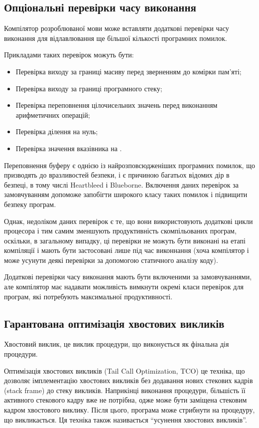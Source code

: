 \documentclass[main.tex]{subfiles}
\begin{document}
\subsection{Опціональні перевірки часу виконання}
Компілятор розроблюваної мови може вставляти додаткові перевірки часу виконання для відлавлювання ще більшої кількості програмних помилок.

Прикладами таких перевірок можуть бути:
\begin{itemize}[nosep]
\item Перевірка виходу за границі масиву перед зверненням до комірки пам'яті;
\item Перевірка виходу за границі програмного стеку;
\item Перевірка переповнення цілочисельних значень перед виконанням арифметичних операцій;
\item Перевірка ділення на нуль;
\item Перевірка значення вказівника на .
\end{itemize}

Переповнення буферу є однією із найрозповсюдженіших програмних помилок, що призводять до вразливостей безпеки, і є причиною багатьох відомих дір в безпеці, в тому числі Heartbleed\cite{heartbleed} і Blueborne\cite{blueborne}.
Включення даних перевірок за замовчуванням допоможе запобігти широкого класу таких помилок і підвищити безпеку програм.

Однак, недоліком даних перевірок є те, що вони використовують додаткові цикли процесора і тим самим зменшують продуктивність скомпільованих програм, оскільки, в загальному випадку, ці перевірки не можуть бути виконані на етапі компіляції і мають бути застосовані лише під час виконнання (хоча компілятор і може усунути деякі перевірки за допомогою статичного аналізу коду).

Додаткові перевірки часу виконання мають бути включеними за замовчуваннями, але компілятор має надавати можливість вимкнути окремі класи перевірок для програм, які потребують максимальної продуктивності.

\subsection{Гарантована оптимізація хвостових викликів}
Хвостовий виклик, це виклик процедури, що виконується як фінальна дія процедури.

Оптимізація хвостових викликів (Tail Call Optimization, TCO) це техніка, що дозволяє імплементацію хвостових викликів без додавання нових стекових кадрів (stack frame) до стеку викликів. Наприкінці виконання процедури, більшість її активного стекового кадру вже не потрібна, одже може бути заміщена стековим кадром хвостового виклику. Після цього, програма може стрибнути на процедуру, що викликається. Ця техніка також називається ``усунення хвостових викликів''.
\end{document}
